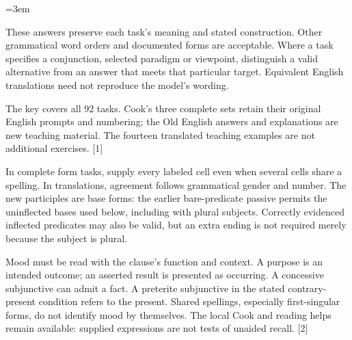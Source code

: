 \BookRecto
\begingroup
\renewcommand{\runningtitle}{Unit 11. Answer key}
\emergencystretch=3em
\newcommand{\itempara}[2]{\par\addvspace{3pt}\noindent\hangindent=1.8em\hangafter=1\makebox[1.8em][l]{#1.}#2\par}
\newcommand{\reserve}[1]{\par\penalty-100\begingroup\dimen0=\pagegoal\advance\dimen0 by-\pagetotal\ifdim\dimen0<#1\newpage\fi\endgroup}

\raggedright
{}

These answers preserve each task's meaning and stated construction. Other grammatical word orders and documented forms are acceptable. Where a task specifies a conjunction, selected paradigm or viewpoint, distinguish a valid alternative from an answer that meets that particular target. Equivalent English translations need not reproduce the model's wording.

The key covers all 92 tasks. Cook's three complete sets retain their original English prompts and numbering; the Old English answers and explanations are new teaching material. The fourteen translated teaching examples are not additional exercises. [1]

In complete form tasks, supply every labeled cell even when several cells share a spelling. In translations, agreement follows grammatical gender and number. The new participles are base forms: the earlier bare-predicate passive permits the uninflected bases used below, including with plural subjects. Correctly evidenced inflected predicates may also be valid, but an extra ending is not required merely because the subject is plural.

Mood must be read with the clause's function and context. A purpose is an intended outcome; an asserted result is presented as occurring. A concessive subjunctive can admit a fact. A preterite subjunctive in the stated contrary-present condition refers to the present. Shared spellings, especially first-singular forms, do not identify mood by themselves. The local Cook and reading helps remain available: supplied expressions are not tests of unaided recall. [2]


